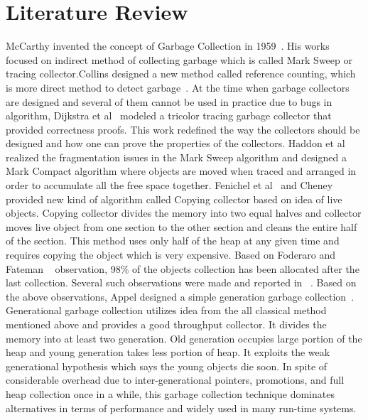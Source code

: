 \section{Literature Review}

McCarthy invented the concept of Garbage Collection in 1959~\cite{mccarthy}. His works focused on indirect method of collecting 
garbage which is called Mark Sweep or tracing collector.Collins designed a new method called reference counting, which is more direct method to detect garbage~\cite{Collins1960}. 
At the time when garbage collectors are designed and several of them cannot be used in practice due to bugs in algorithm, Dijkstra et al~\cite{dijkstra} modeled a tricolor tracing garbage collector that provided correctness proofs. This work redefined the 
 way the collectors should be designed and how one can prove the properties of the collectors. Haddon et al ~\cite{haddon} realized 
 the fragmentation issues in the Mark Sweep algorithm and designed a Mark Compact algorithm where objects are moved when traced and arranged in order to accumulate all the free space together. Fenichel et al~\cite{feni} and Cheney~\cite{cheney}
 provided new kind of algorithm called Copying collector based on idea of live objects. Copying collector divides the memory into two equal halves and collector moves live object from one section to the other section and cleans the entire half of the section. This method uses only half of the heap at any given time and requires copying the object which is very expensive. Based on Foderaro and Fateman ~\cite{fode81} observation,  98\% of the objects collection has been allocated after the last collection. Several such observations were made and reported in ~\cite{zorn89,sans93}. Based on the above observations, Appel  designed a simple generation garbage collection~\cite{Appel89}. Generational garbage collection utilizes idea from the all classical method mentioned above and provides a good throughput collector. It divides the memory into at least two generation. Old generation occupies large portion of the heap and young generation takes less portion of heap. It exploits the weak generational hypothesis which says the young objects die soon. In spite of considerable overhead due to inter-generational pointers, promotions, and full heap collection once in a while, this garbage collection technique dominates alternatives in terms of performance and widely used in many run-time systems.
 
